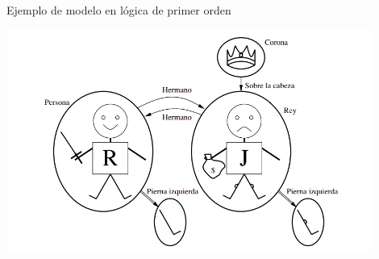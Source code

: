 \begin{frame}{Ejemplo de modelo en l\'ogica de primer orden}
    
    \centering
    \includegraphics[width=0.9\textwidth]{10_images_model.png}
    
\end{frame}
